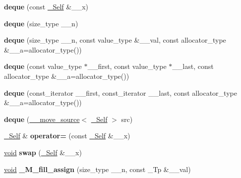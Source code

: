 \begin{DoxyCompactItemize}
\item 
\mbox{\label{classdeque_ae315582b08dbf9ac98a7f7c44d022a2f}} 
{\bfseries deque} (const \hyperlink{classdeque}{\+\_\+\+Self} \&\+\_\+\+\_\+x)
\item 
\mbox{\label{classdeque_a2032bedb8662f1aa7eaee5d0d6609aa5}} 
{\bfseries deque} (size\+\_\+type \+\_\+\+\_\+n)
\item 
\mbox{\label{classdeque_ae42bc5bbeaae902d4cca2f68c2d790ab}} 
{\bfseries deque} (size\+\_\+type \+\_\+\+\_\+n, const value\+\_\+type \&\+\_\+\+\_\+val, const allocator\+\_\+type \&\+\_\+\+\_\+a=allocator\+\_\+type())
\item 
\mbox{\label{classdeque_ad02ccbea3f5ab0d9b2c30c33f83c8c50}} 
{\bfseries deque} (const value\+\_\+type $\ast$\+\_\+\+\_\+first, const value\+\_\+type $\ast$\+\_\+\+\_\+last, const allocator\+\_\+type \&\+\_\+\+\_\+a=allocator\+\_\+type())
\item 
\mbox{\label{classdeque_a39fddb3c21bd676926040d9496fda161}} 
{\bfseries deque} (const\+\_\+iterator \+\_\+\+\_\+first, const\+\_\+iterator \+\_\+\+\_\+last, const allocator\+\_\+type \&\+\_\+\+\_\+a=allocator\+\_\+type())
\item 
\mbox{\label{classdeque_a8047e4723c11c7098194f7d62353ad13}} 
{\bfseries deque} (\hyperlink{class____move__source}{\+\_\+\+\_\+move\+\_\+source}$<$ \hyperlink{classdeque}{\+\_\+\+Self} $>$ src)
\item 
\mbox{\label{classdeque_a21d44f46bcf2ca8448ede05a56719c00}} 
\hyperlink{classdeque}{\+\_\+\+Self} \& {\bfseries operator=} (const \hyperlink{classdeque}{\+\_\+\+Self} \&\+\_\+\+\_\+x)
\item 
\mbox{\label{classdeque_a33bb324e2a525a085c3a1df23990b184}} 
\hyperlink{interfacevoid}{void} {\bfseries swap} (\hyperlink{classdeque}{\+\_\+\+Self} \&\+\_\+\+\_\+x)
\item 
\mbox{\label{classdeque_a9d233a4b7184da8b29d69fa3fad8a483}} 
\hyperlink{interfacevoid}{void} {\bfseries \+\_\+\+M\+\_\+fill\+\_\+assign} (size\+\_\+type \+\_\+\+\_\+n, const \+\_\+\+Tp \&\+\_\+\+\_\+val)

\end{DoxyCompactItemize}

